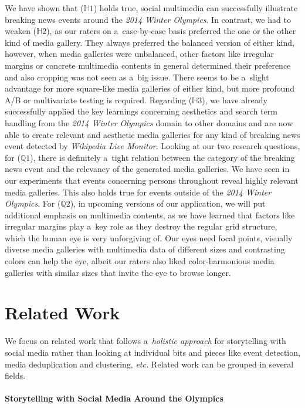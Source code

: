 \documentclass{sig-alternate-somus}
\begin{document}
We have shown that ($\mathbb{H}1$) holds true,
social multimedia can successfully illustrate breaking news events
around the \emph{2014 Winter Olympics}.
In contrast, we had to weaken ($\mathbb{H}2$),
as our raters on a~case-by-case basis preferred
the one or the other kind of media gallery.
They always preferred the balanced version of either kind,
however, when media galleries were unbalanced,
other factors like irregular margins or
concrete multimedia contents in general determined their preference
and also cropping was not seen as a~big issue.
There seems to be a~slight advantage
for more square-like media galleries of either kind,
but more profound A/B or multivariate testing is required.
Regarding ($\mathbb{H}3$), we have already successfully
applied the key learnings concerning aesthetics
and search term handling from the \emph{2014 Winter Olympics} domain
to other domains and are now able to create relevant and aesthetic
media galleries for any kind of breaking news event
detected by \emph{Wikipedia Live Monitor}. 
Looking at our two research questions, for ($\mathbb{Q}1$),
there is definitely a~tight relation
between the category of the breaking news event
and the relevancy of the generated media galleries.
We have seen in our experiments that events concerning persons
throughout reveal highly relevant media galleries.
This also holds true for events outside of the \emph{2014 Winter Olympics}.
For ($\mathbb{Q}2$), in upcoming versions of our application,
we will put additional emphasis on multimedia contents,
as we have learned that factors like irregular margins play
a~key role as they destroy the regular grid structure,
which the human eye is very unforgiving of.
Our eyes need focal points,
visually diverse media galleries with multimedia data
of different sizes and contrasting colors can help the eye,
albeit our raters also liked color-harmonious media galleries
with similar sizes that invite the eye to browse longer.

\section{Related Work}
\label{sec:related-work}
\selectfont

We focus on related work that follows a~\emph{holistic approach}
for storytelling with social media
rather than looking at individual bits and pieces
like event detection, media deduplication and clustering, \emph{etc.}
Related work can be grouped in several fields.

\paragraph{Storytelling with Social Media Around the Olympics}
\end{document}
